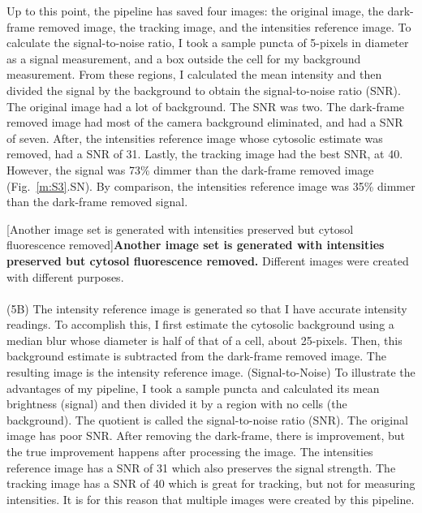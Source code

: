 Up to this point, the pipeline has saved four images: the original image, the dark-frame removed image, the tracking image, and the intensities reference image. To calculate the signal-to-noise ratio, I took a sample puncta of 5-pixels in diameter as a signal measurement, and a box outside the cell for my background measurement. From these regions, I calculated the mean intensity and then divided the signal by the background to obtain the signal-to-noise ratio (SNR). The original image had a lot of background. The SNR was two. The dark-frame removed image had most of the camera background eliminated, and had a SNR of seven. After, the intensities reference image whose cytosolic estimate was removed, had a SNR of 31. Lastly, the tracking image had the best SNR, at 40. However, the signal was 73\% dimmer than the dark-frame removed image (Fig.~\ref{m:S3}.SN). By comparison, the intensities reference image was 35\% dimmer than the dark-frame removed signal.


\begin{centering}
\captionsetup{parbox=none}
[Another image set is generated with intensities preserved but cytosol fluorescence removed]{\textbf{Another image set is generated with intensities preserved but cytosol fluorescence removed.} Different images were created with different purposes.
\\
\\
(5B) The intensity reference image is generated so that I have accurate intensity readings. To accomplish this, I first estimate the cytosolic background using a median blur whose diameter is half of that of a cell, about 25-pixels. Then, this background estimate is subtracted from the dark-frame removed image. The resulting image is the intensity reference image. (Signal-to-Noise) To illustrate the advantages of my pipeline, I took a sample puncta and calculated its mean brightness (signal) and then divided it by a region with no cells (the background). The quotient is called the signal-to-noise ratio (SNR). The original image has poor SNR. After removing the dark-frame, there is improvement, but the true improvement happens after processing the image. The intensities reference image has a SNR of 31 which also preserves the signal strength. The tracking image has a SNR of 40 which is great for tracking, but not for measuring intensities. It is for this reason that multiple images were created by this pipeline.}
\label{m:S3}
\end{centering}



